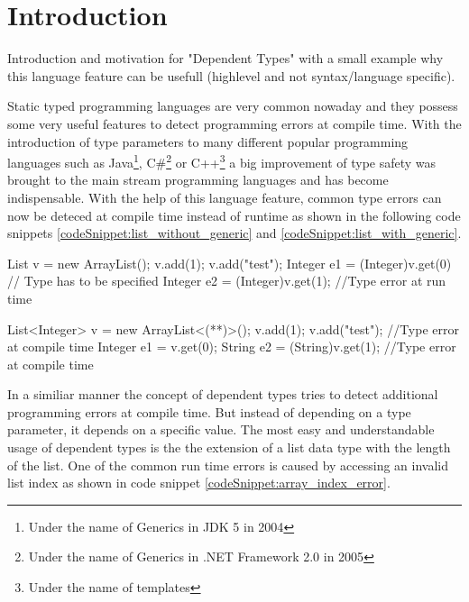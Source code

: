 \section{Introduction}\label{section:introduction}
Introduction and motivation for "Dependent Types" with a small example why this language feature can be usefull (highlevel and not syntax/language specific).

Static typed programming languages are very common nowaday and they possess some very useful features to detect programming errors at compile time.
With the introduction of type parameters to many different popular programming languages such as Java\footnote{Under the name of Generics in JDK 5 in 2004\cite{JDK5}},
 C\#\footnote{Under the name of Generics in .NET Framework 2.0 in 2005\cite{dotnet20}} or C++\footnote{Under the name of templates} a big improvement of type safety was brought to the main stream programming languages and has become indispensable.
With the help of this language feature, common type errors can now be deteced at compile time instead of runtime as shown in the following code snippets \ref{codeSnippet:list_without_generic} and \ref{codeSnippet:list_with_generic}.
\begin{adjustbox}{width=\columnwidth}
\begin{codesnippet}[caption={List without generic argument}, label={codeSnippet:list_without_generic}]
List v = new ArrayList();
v.add(1);
v.add("test");
Integer e1 = (Integer)v.get(0) // Type has to be specified
Integer e2 = (Integer)v.get(1); //Type error at run time
\end{codesnippet}
\end{adjustbox}
\begin{adjustbox}{width=\columnwidth}
\begin{codesnippet}[escapeinside={(*}{*)}, caption={List with type argument}, label={codeSnippet:list_with_generic}]
List<Integer> v = new ArrayList<(**)>();
v.add(1);
v.add("test"); //Type error at compile time
Integer e1 = v.get(0);
String e2 = (String)v.get(1); //Type error at compile time
\end{codesnippet}
\end{adjustbox}

In a similiar manner the concept of dependent types tries to detect additional programming errors at compile time. But instead of depending on a type parameter, it depends on a specific value. 
The most easy and understandable usage of dependent types is the the extension of a list data type with the length of the list. 
One of the common run time errors is caused by accessing an invalid list index as shown in code snippet \ref{codeSnippet:array_index_error}.

